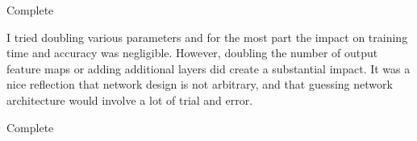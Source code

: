 \documentclass[11pt]{article}
\begin{document}
\begin{solution}
	Complete

	I tried doubling various parameters and for the most part the impact on
	training  time and accuracy was negligible. However, doubling the number of
	output feature maps or adding additional layers did create a substantial
	impact. It was a nice reflection that network design is not arbitrary, and
	that guessing network architecture would involve a lot of trial and error.
\end{solution}
\begin{solution}Complete\end{solution}
\end{document}
